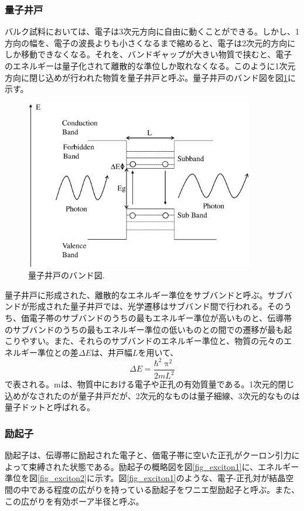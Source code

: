 \documentclass[11pt,a4j]{jsarticle}
\begin{document}
\newpage
\subsubsection{量子井戸}
バルク試料においては、電子は3次元方向に自由に動くことができる。しかし、1方向の幅を、電子の波長よりも小さくなるまで縮めると、電子は2次元的方向にしか移動できなくなる。それを、バンドギャップが大きい物質で挟むと、電子のエネルギーは量子化されて離散的な準位しか取れなくなる。このように1次元方向に閉じ込めが行われた物質を量子井戸と呼ぶ。量子井戸のバンド図を図\ref{fig_qw1}に示す。

\begin{figure}[h]
 \centering
 \includegraphics[clip,width=10cm]{start_subband.eps}
 \caption{量子井戸のバンド図.}
 \label{fig_qw1}
\end{figure}

量子井戸に形成された、離散的なエネルギー準位をサブバンドと呼ぶ。サブバンドが形成された量子井戸では、光学遷移はサブバンド間で行われる。そのうち、価電子帯のサブバンドのうちの最もエネルギー準位が高いものと、伝導帯のサブバンドのうちの最もエネルギー準位の低いものとの間での遷移が最も起こりやすい。また、それらのサブバンドのエネルギー準位と、物質の元々のエネルギー準位との差$\Delta E$は、井戸幅$L$を用いて、
\begin{equation}
 \Delta E=\frac{\mathrm{\hbar}^{2}\uppi^{2}}{2mL^{2}}
 \label{eq_qw}
\end{equation}
で表される。mは、物質中における電子や正孔の有効質量である。1次元的閉じ込めがなされたのが量子井戸だが、2次元的なものは量子細線、3次元的なものは量子ドットと呼ばれる。

\newpage
\subsubsection{励起子}
励起子は、伝導帯に励起された電子と、価電子帯に空いた正孔がクーロン引力によって束縛された状態である。励起子の概略図を図\ref{fig_exciton1}に、エネルギー準位を図\ref{fig_exciton2}に示す。図\ref{fig_exciton1}のような、電子-正孔対が結晶空間の中である程度の広がりを持っている励起子をワニエ型励起子と呼ぶ。また、この広がりを有効ボーア半径と呼ぶ。
\end{document}
